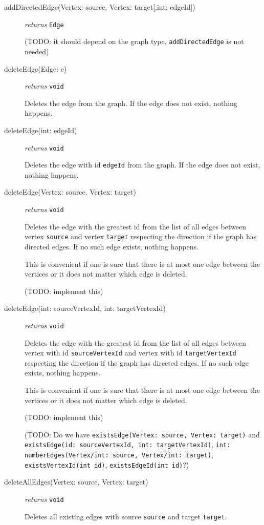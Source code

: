 \documentclass{article}
\begin{document}
\begin{description}
\item[addDirectedEdge(Vertex: source, Vertex: target{[,int: edgeId]})]
  \emph{returns} \texttt{Edge}

(TODO: it should depend on the graph type, \texttt{addDirectedEdge} is
not needed)


\item[deleteEdge(Edge: e)] \emph{returns} \texttt{void}

Deletes the edge from the graph. If the edge does not exist, nothing
happens.

\item[deleteEdge(int: edgeId)] \emph{returns} \texttt{void}

Deletes the edge with id \texttt{edgeId} from the graph. If the edge does not exist, nothing
happens.

\item[deleteEdge(Vertex: source, Vertex: target)] \emph{returns}
  \texttt{void}

  Deletes the edge with the greatest id from the list of all edges
  between vertex \texttt{source} and vertex \texttt{target} respecting
  the direction if the graph has directed edges. If no such edge exists, nothing happens.

  This is convenient if one is sure that there is at most one edge
  between the vertices or it does not matter which edge is deleted.

  (TODO: implement this)

\item[deleteEdge(int: sourceVertexId, int: targetVertexId)] \emph{returns}
  \texttt{void}

  Deletes the edge with the greatest id from the list of all edges
  between vertex with id \texttt{sourceVertexId} and vertex with id \texttt{targetVertexId} respecting
  the direction if the graph has directed edges. If no such edge exists, nothing happens.

  This is convenient if one is sure that there is at most one edge
  between the vertices or it does not matter which edge is deleted.

  (TODO: implement this)

  (TODO: Do we have \texttt{existsEdge(Vertex: source, Vertex:
    target)} and \texttt{existsEdge(id: sourceVertexId, int:
    targetVertexId)}, \texttt{int: numberEdges(Vertex/int: source,
    Vertex/int: target)}, \texttt{existsVertexId(int id)}, \texttt{existsEdgeId(int id)}?)
\item[deleteAllEdges(Vertex: source, Vertex: target)] \emph{returns}
  \texttt{void}

  Deletes all existing edges with source \texttt{source} and target
  \texttt{target}.
  
\end{description}
\end{document}
